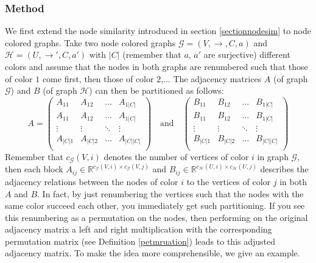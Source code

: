 \documentclass[a4paper,11pt]{report}
\newcommand{\R}{{\mathbb R}}
\newcommand{\graf}{\mathscr{G}}
\newcommand{\grafeen}{\mathscr{H}}
\begin{document}
\subsubsection{Method}
We first extend the node similarity introduced in section \ref{sectionnodesim} to 
node colored graphs. Take two node colored graphs $\graf=(V,\to, C, a)$ and $\grafeen=(U,\to', C, a')$ with $|C|$ (remember that $a$, $a'$ are surjective) different colors and assume that the nodes 
in both graphs are renumbered such that those of color $1$ come first, then 
those of color $2$,... The adjacency matrices $A$ (of graph $\graf$) and $B$ (of graph $\grafeen$) 
can then be partitioned as follows:
$$A = \begin{pmatrix}
A_{11} & A_{12} & \ldots & A_{1|C|}\\
A_{11} & A_{12} & \ldots & A_{1|C|}\\
\vdots & \vdots & \ddots & \vdots\\
A_{|C|1} & A_{|C|2} & \ldots & A_{|C||C|}\\
\end{pmatrix}
 \quad \text{and} \quad
 \begin{pmatrix}
B_{11} & B_{12} & \ldots & B_{1|C|}\\
B_{11} & B_{12} & \ldots & B_{1|C|}\\
\vdots & \vdots & \ddots & \vdots\\
B_{|C|1} & B_{|C|2} & \ldots & B_{|C||C|}\\
\end{pmatrix}$$
Remember that $c_\graf(V,i)$ denotes the number of vertices of color $i$ in graph $\graf$, then each block $A_{ij} \in \R^{c_\graf(V,i)\times c_\graf(V,j)}$ and $B_{ij} \in \R^{c_\grafeen(U,i)\times c_\grafeen(U,j)}$ 
describes the adjacency relations between the nodes of color $i$ to the vertices 
of color $j$ in both $A$ and $B$. In fact, by just renumbering the vertices such 
that the nodes with the same color succeed each other, you immediately get such 
partitioning. If you see this renumbering as a permutation on the nodes,
then performing on the original adjacency matrix a left and right multiplication with the corresponding permutation matrix (see Definition 
\ref{petmruation}) leads to this adjusted adjacency matrix.
To make the idea more comprehensible, we give an example.
\end{document}
